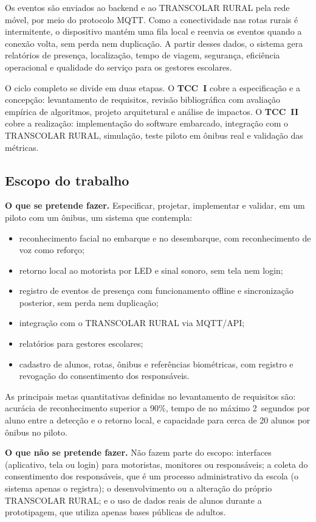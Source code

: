 \documentclass[
    12pt,
    oneside,
    a4paper,
    article,
    english,
    brazil
    ]{abntex2}
\begin{document}
Os eventos são enviados ao backend e ao TRANSCOLAR RURAL pela rede móvel, por
meio do protocolo MQTT. Como a conectividade nas rotas rurais é intermitente,
o dispositivo mantém uma fila local e reenvia os eventos quando a conexão volta,
sem perda nem duplicação. A partir desses dados, o sistema gera relatórios de
presença, localização, tempo de viagem, segurança, eficiência operacional e
qualidade do serviço para os gestores escolares.

O ciclo completo se divide em duas etapas. O \textbf{TCC~I} cobre a
especificação e a concepção: levantamento de requisitos, revisão bibliográfica
com avaliação empírica de algoritmos, projeto arquitetural e análise de
impactos. O \textbf{TCC~II} cobre a realização: implementação do software
embarcado, integração com o TRANSCOLAR RURAL, simulação, teste piloto em
ônibus real e validação das métricas.

\subsection{Escopo do trabalho}

\textbf{O que se pretende fazer.} Especificar, projetar, implementar e validar,
em um piloto com um ônibus, um sistema que contempla:

\begin{itemize}
    \item reconhecimento facial no embarque e no desembarque, com
          reconhecimento de voz como reforço;
    \item retorno local ao motorista por LED e sinal sonoro, sem tela nem login;
    \item registro de eventos de presença com funcionamento offline e
          sincronização posterior, sem perda nem duplicação;
    \item integração com o TRANSCOLAR RURAL via MQTT/API;
    \item relatórios para gestores escolares;
    \item cadastro de alunos, rotas, ônibus e referências biométricas, com
          registro e revogação do consentimento dos responsáveis.
\end{itemize}

As principais metas quantitativas definidas no levantamento de requisitos são:
acurácia de reconhecimento superior a 90\%, tempo de no máximo 2~segundos por
aluno entre a detecção e o retorno local, e capacidade para cerca de 20 alunos
por ônibus no piloto.

\textbf{O que não se pretende fazer.} Não fazem parte do escopo: interfaces
(aplicativo, tela ou login) para motoristas, monitores ou responsáveis; a coleta
do consentimento dos responsáveis, que é um processo administrativo da escola
(o sistema apenas o registra); o desenvolvimento ou a alteração do próprio
TRANSCOLAR RURAL; e o uso de dados reais de alunos durante a prototipagem, que
utiliza apenas bases públicas de adultos.
\end{document}
